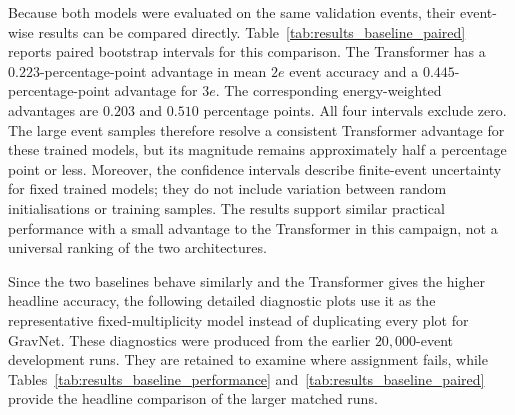 

Because both models were evaluated on the same validation events, their
event-wise results can be compared directly. Table~\ref{tab:results_baseline_paired}
reports paired bootstrap intervals for this comparison. The Transformer has a
\(0.223\)-percentage-point advantage in mean \(2e\) event accuracy and a
\(0.445\)-percentage-point advantage for \(3e\). The corresponding
energy-weighted advantages are \(0.203\) and \(0.510\) percentage points. All
four intervals exclude zero. The large event samples therefore resolve a
consistent Transformer advantage for these trained models, but its magnitude
remains approximately half a percentage point or less. Moreover, the
confidence intervals describe finite-event uncertainty for fixed trained
models; they do not include variation between random initialisations or
training samples. The results support similar practical performance with a
small advantage to the Transformer in this campaign, not a universal ranking
of the two architectures.



Since the two baselines behave similarly and the Transformer gives the higher
headline accuracy, the following detailed diagnostic plots use it as the
representative fixed-multiplicity model instead of duplicating every plot for
GravNet. These diagnostics were produced from the earlier
\(20{,}000\)-event development runs. They are retained to examine where
assignment fails, while Tables~\ref{tab:results_baseline_performance}
and~\ref{tab:results_baseline_paired} provide the headline comparison of the
larger matched runs.

\clearpage

